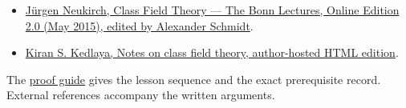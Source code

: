 \documentclass[11pt,a4paper]{article}
\newcommand{\tightlist}{\setlength{\itemsep}{0pt}\setlength{\parskip}{0pt}}
\begin{document}
\begin{itemize}
\tightlist
\item
  \href{https://www.mathi.uni-heidelberg.de/~schmidt/Neukirch-en/Neukirch_cft_02_may15.pdf}{Jürgen
  Neukirch, Class Field Theory --- The Bonn Lectures, Online Edition 2.0
  (May 2015), edited by Alexander Schmidt}.
\item
  \href{https://kskedlaya.org/cft/sec_abstractcft1.html}{Kiran S.
  Kedlaya, Notes on class field theory, author-hosted HTML edition}.
\end{itemize}

The \href{../free-proofs.html}{proof guide} gives the lesson sequence
and the exact prerequisite record. External references accompany the
written arguments.
\end{document}
